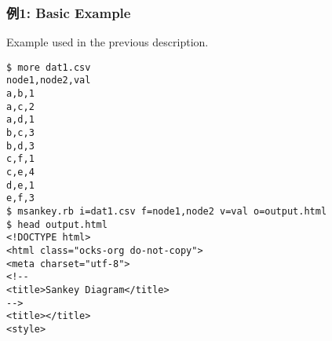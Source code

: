 \subsubsection*{例1: Basic Example}

Example used in the previous description.


\begin{Verbatim}[baselinestretch=0.7,frame=single]
$ more dat1.csv
node1,node2,val
a,b,1
a,c,2
a,d,1
b,c,3
b,d,3
c,f,1
c,e,4
d,e,1
e,f,3
$ msankey.rb i=dat1.csv f=node1,node2 v=val o=output.html
$ head output.html
<!DOCTYPE html>
<html class="ocks-org do-not-copy">
<meta charset="utf-8">
<!--
<title>Sankey Diagram</title>
-->
<title></title>
<style>
\end{Verbatim}
